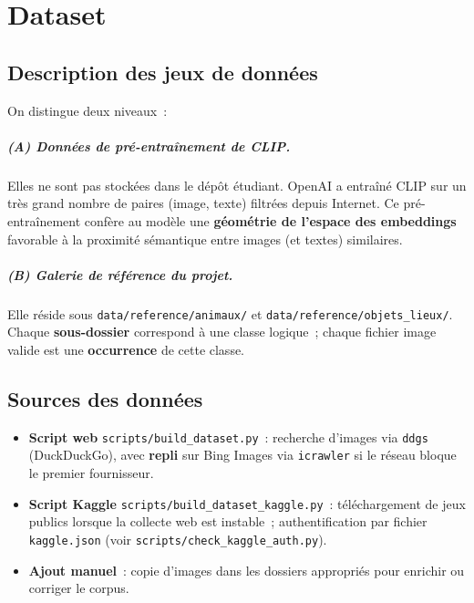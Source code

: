 \documentclass[11pt,a4paper,openany]{report}
\begin{document}
\chapter{Dataset}

\section{Description des jeux de données}

On distingue deux niveaux~:

\paragraph{(A) Données de pré-entraînement de CLIP.} Elles ne sont pas stockées dans le dépôt étudiant. OpenAI a entraîné CLIP sur un très grand nombre de paires (image, texte) filtrées depuis Internet. Ce pré-entraînement confère au modèle une \textbf{géométrie de l'espace des embeddings} favorable à la proximité sémantique entre images (et textes) similaires.

\paragraph{(B) Galerie de référence du projet.} Elle réside sous \texttt{data/reference/animaux/} et \texttt{data/reference/objets\_lieux/}. Chaque \textbf{sous-dossier} correspond à une classe logique~; chaque fichier image valide est une \textbf{occurrence} de cette classe.

\section{Sources des données}

\begin{itemize}[leftmargin=*]
  \item \textbf{Script web} \texttt{scripts/build\_dataset.py}~: recherche d'images via \texttt{ddgs} (DuckDuckGo), avec \textbf{repli} sur Bing Images via \texttt{icrawler} si le réseau bloque le premier fournisseur.
  \item \textbf{Script Kaggle} \texttt{scripts/build\_dataset\_kaggle.py}~: téléchargement de jeux publics lorsque la collecte web est instable~; authentification par fichier \texttt{kaggle.json} (voir \texttt{scripts/check\_kaggle\_auth.py}).
  \item \textbf{Ajout manuel}~: copie d'images dans les dossiers appropriés pour enrichir ou corriger le corpus.
\end{itemize}
\end{document}
